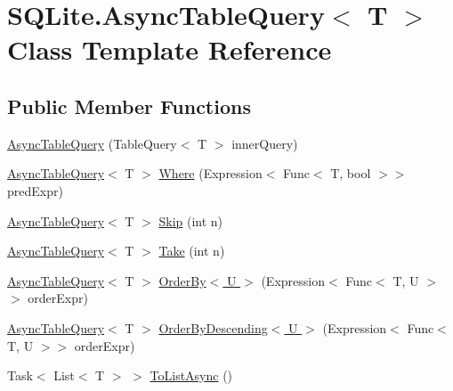 \hypertarget{class_s_q_lite_1_1_async_table_query_3_01_t_01_4}{\section{S\+Q\+Lite.\+Async\+Table\+Query$<$ T $>$ Class Template Reference}
\label{class_s_q_lite_1_1_async_table_query_3_01_t_01_4}
}
\subsection*{Public Member Functions}
\begin{DoxyCompactItemize}
\item 
\hyperlink{class_s_q_lite_1_1_async_table_query_3_01_t_01_4_a0255986ac768d5fca5b4e2c9840da35d}{Async\+Table\+Query} (Table\+Query$<$ T $>$ inner\+Query)
\item 
\hyperlink{class_s_q_lite_1_1_async_table_query_3_01_t_01_4_a0255986ac768d5fca5b4e2c9840da35d}{Async\+Table\+Query}$<$ T $>$ \hyperlink{class_s_q_lite_1_1_async_table_query_3_01_t_01_4_afe04f8363082a033b984230c7a245dea}{Where} (Expression$<$ Func$<$ T, bool $>$$>$ pred\+Expr)
\item 
\hyperlink{class_s_q_lite_1_1_async_table_query_3_01_t_01_4_a0255986ac768d5fca5b4e2c9840da35d}{Async\+Table\+Query}$<$ T $>$ \hyperlink{class_s_q_lite_1_1_async_table_query_3_01_t_01_4_ab1b8210413273abe6bc9383bc4f7ea9c}{Skip} (int n)
\item 
\hyperlink{class_s_q_lite_1_1_async_table_query_3_01_t_01_4_a0255986ac768d5fca5b4e2c9840da35d}{Async\+Table\+Query}$<$ T $>$ \hyperlink{class_s_q_lite_1_1_async_table_query_3_01_t_01_4_a6c47c652b3b8123e2d4961263c289af9}{Take} (int n)
\item 
\hyperlink{class_s_q_lite_1_1_async_table_query_3_01_t_01_4_a0255986ac768d5fca5b4e2c9840da35d}{Async\+Table\+Query}$<$ T $>$ \hyperlink{class_s_q_lite_1_1_async_table_query_3_01_t_01_4_a41540b08c3c49c123b57de8a0a5e3aea}{Order\+By$<$ U $>$} (Expression$<$ Func$<$ T, U $>$$>$ order\+Expr)
\item 
\hyperlink{class_s_q_lite_1_1_async_table_query_3_01_t_01_4_a0255986ac768d5fca5b4e2c9840da35d}{Async\+Table\+Query}$<$ T $>$ \hyperlink{class_s_q_lite_1_1_async_table_query_3_01_t_01_4_a4a45b5c81ccf4459f17d66fba6a18c3f}{Order\+By\+Descending$<$ U $>$} (Expression$<$ Func$<$ T, U $>$$>$ order\+Expr)
\item 
Task$<$ List$<$ T $>$ $>$ \hyperlink{class_s_q_lite_1_1_async_table_query_3_01_t_01_4_a7343ff525af21bdc055935f46a39ae72}{To\+List\+Async} ()
$$
\end{DoxyCompactItemize}
